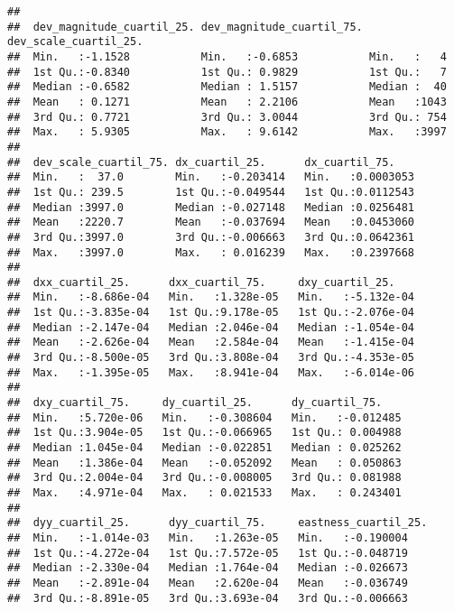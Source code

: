 \documentclass[11pt,]{article}
\begin{document}
\begin{verbatim}
##                                                               
##  dev_magnitude_cuartil_25. dev_magnitude_cuartil_75. dev_scale_cuartil_25.
##  Min.   :-1.1528           Min.   :-0.6853           Min.   :   4         
##  1st Qu.:-0.8340           1st Qu.: 0.9829           1st Qu.:   7         
##  Median :-0.6582           Median : 1.5157           Median :  40         
##  Mean   : 0.1271           Mean   : 2.2106           Mean   :1043         
##  3rd Qu.: 0.7721           3rd Qu.: 3.0044           3rd Qu.: 754         
##  Max.   : 5.9305           Max.   : 9.6142           Max.   :3997         
##                                                                           
##  dev_scale_cuartil_75. dx_cuartil_25.      dx_cuartil_75.     
##  Min.   :  37.0        Min.   :-0.203414   Min.   :0.0003053  
##  1st Qu.: 239.5        1st Qu.:-0.049544   1st Qu.:0.0112543  
##  Median :3997.0        Median :-0.027148   Median :0.0256481  
##  Mean   :2220.7        Mean   :-0.037694   Mean   :0.0453060  
##  3rd Qu.:3997.0        3rd Qu.:-0.006663   3rd Qu.:0.0642361  
##  Max.   :3997.0        Max.   : 0.016239   Max.   :0.2397668  
##                                                               
##  dxx_cuartil_25.      dxx_cuartil_75.     dxy_cuartil_25.     
##  Min.   :-8.686e-04   Min.   :1.328e-05   Min.   :-5.132e-04  
##  1st Qu.:-3.835e-04   1st Qu.:9.178e-05   1st Qu.:-2.076e-04  
##  Median :-2.147e-04   Median :2.046e-04   Median :-1.054e-04  
##  Mean   :-2.626e-04   Mean   :2.584e-04   Mean   :-1.415e-04  
##  3rd Qu.:-8.500e-05   3rd Qu.:3.808e-04   3rd Qu.:-4.353e-05  
##  Max.   :-1.395e-05   Max.   :8.941e-04   Max.   :-6.014e-06  
##                                                               
##  dxy_cuartil_75.     dy_cuartil_25.      dy_cuartil_75.     
##  Min.   :5.720e-06   Min.   :-0.308604   Min.   :-0.012485  
##  1st Qu.:3.904e-05   1st Qu.:-0.066965   1st Qu.: 0.004988  
##  Median :1.045e-04   Median :-0.022851   Median : 0.025262  
##  Mean   :1.386e-04   Mean   :-0.052092   Mean   : 0.050863  
##  3rd Qu.:2.004e-04   3rd Qu.:-0.008005   3rd Qu.: 0.081988  
##  Max.   :4.971e-04   Max.   : 0.021533   Max.   : 0.243401  
##                                                             
##  dyy_cuartil_25.      dyy_cuartil_75.     eastness_cuartil_25.
##  Min.   :-1.014e-03   Min.   :1.263e-05   Min.   :-0.190004   
##  1st Qu.:-4.272e-04   1st Qu.:7.572e-05   1st Qu.:-0.048719   
##  Median :-2.330e-04   Median :1.764e-04   Median :-0.026673   
##  Mean   :-2.891e-04   Mean   :2.620e-04   Mean   :-0.036749   
##  3rd Qu.:-8.891e-05   3rd Qu.:3.693e-04   3rd Qu.:-0.006663   

\end{verbatim}
\end{document}

